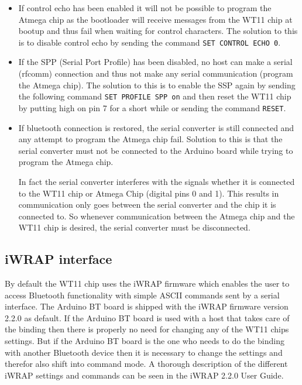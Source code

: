 \documentclass[a4paper, oneside, final]{memoir}
\begin{document}
\begin{itemize}
\item If control echo has been enabled it will not be possible to program the
  Atmega chip as the bootloader will receive messages from the WT11 chip at
  bootup and thus fail when waiting for control characters. The solution to this
  is to disable control echo by sending the command \texttt{SET CONTROL ECHO 0}.

\item If the SPP (Serial Port Profile) has been disabled, no host can make a
  serial (rfcomm) connection and thus not make any serial communication (program
  the Atmega chip). The solution to this is to enable the SSP again by sending
  the following command \texttt{SET PROFILE SPP on} and then reset the WT11 chip
  by putting high on pin 7 for a short while or sending the command
  \texttt{RESET}.

\item If bluetooth connection is restored, the serial converter is still
  connected and any attempt to program the Atmega chip fail. Solution to this is
  that the serial converter must not be connected to the Arduino board while
  trying to program the Atmega chip. 

  In fact the serial converter interferes with the signals whether it is
  connected to the WT11 chip or Atmega Chip (digital pins 0 and 1). This results
  in communication only goes between the serial converter and the chip it is
  connected to. So whenever communication between the Atmega chip and the WT11
  chip is desired, the serial converter must be disconnected.
\end{itemize}

\subsection{iWRAP interface}

By default the WT11 chip uses the iWRAP firmware which enables the user to
access Bluetooth functionality with simple ASCII commands sent by a serial
interface. The Arduino BT board is shipped with the iWRAP firmware version 2.2.0
as default. If the Arduino BT board is used with a host that takes care of the
binding then there is properly no need for changing any of the WT11 chips
settings. But if the Arduino BT board is the one who needs to do the binding
with another Bluetooth device then it is necessary to change the settings and
therefor also shift into command mode. A thorough description of the different
iWRAP settings and commands can be seen in the iWRAP 2.2.0 User
Guide\cite{iWRAP220UG}.
\end{document}
